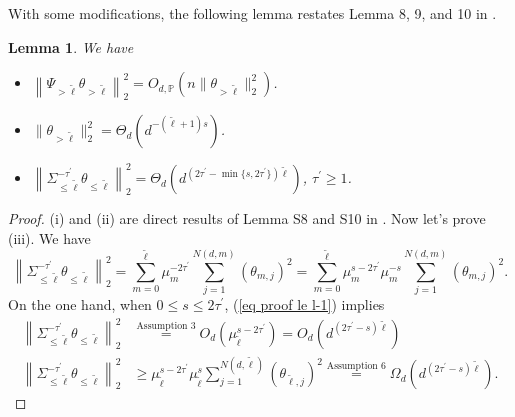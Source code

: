 \documentclass{article}
\theoremstyle{plain}
\newtheorem{lemma}[theorem]{Lemma}
\theoremstyle{definition}
\theoremstyle{remark}
\begin{document}
\begin{appendix}
With some modifications, the following lemma restates Lemma 8, 9, and 10 in \cite{zhang2024phase}.

\begin{lemma}\label{lemma ge l l2}
We have
\begin{itemize}
    \item[(i)] $\left\| \Psi_{>\tilde{\ell}} \theta_{>\tilde{\ell}} \right\|_{2}^{2} = O_{d, \mathbb{P}}\left( n  \| \theta_{>\tilde{\ell}} \|_{2}^{2}\right)$.

    \item[(ii)] $\| \theta_{>\tilde{\ell}} \|_{2}^{2}  = \Theta_d \left(  d^{-(\tilde{\ell}+1)s} \right)$.

    \item[(iii)] $\left\| \Sigma_{\leq \tilde{\ell}}^{-\tau^{\prime}}  \theta_{\leq \tilde{\ell}} \right\|_{2}^{2}  = \Theta_{d} \left(  d^{(2\tau^{\prime}-\min\{s, 2\tau^{\prime}\})\tilde{\ell} } \right)$, $\tau^{\prime} \geq 1$.
\end{itemize}
\end{lemma}
\begin{proof}
(i) and (ii) are direct results of Lemma S8 and S10 in \cite{zhang2024phase}. Now let's prove (iii). We have
\begin{equation}\label{eq proof le l-1}
        \left\| \Sigma_{\leq \tilde{\ell}}^{-\tau^{\prime}}  \theta_{\leq \tilde{\ell}} \right\|_{2}^{2} = 
        \sum\limits_{m = 0}^{\tilde{\ell}} \mu_{m}^{-2\tau^{\prime}} \sum\limits_{j = 1 }^{N(d, m)} (\theta_{m,j})^{2} 
        = \sum\limits_{m = 0}^{\tilde{\ell}} \mu_{m}^{s-2\tau^{\prime}} \mu_{m}^{-s}\sum\limits_{j = 1 }^{N(d, m)} (\theta_{m,j})^{2}.
    \end{equation}
On the one hand, when $0 \leq s \leq 2\tau^{\prime}$, (\ref{eq proof le l-1}) implies
\begin{equation*}
\begin{aligned}
    \left\| \Sigma_{\leq \tilde{\ell}}^{-\tau^{\prime}}  \theta_{\leq \tilde{\ell}} \right\|_{2}^{2} & \overset{\text{Assumption } 3}{=} 
    O_{d} \left(  \mu_{\tilde{\ell}}^{s-2\tau^{\prime}} \right) =
        O_{d} \left(  d^{(2\tau^{\prime}-s)\tilde{\ell} } \right)\\
        \left\| \Sigma_{\leq \tilde{\ell}}^{-\tau^{\prime}}  \theta_{\leq \tilde{\ell}} \right\|_{2}^{2} &\geq \mu_{\tilde{\ell}}^{s-2\tau^{\prime}} \mu_{\tilde{\ell}}^{s}\sum\limits_{j = 1 }^{N(d, \tilde{\ell})} (\theta_{\tilde{\ell},j})^{2} \overset{\text{Assumption } 6}{=}
        \Omega_{d} \left( d^{(2\tau^{\prime}-s)\tilde{\ell} } \right).

\end{aligned}
\end{equation*}
\end{proof}
\end{appendix}
\end{document}
